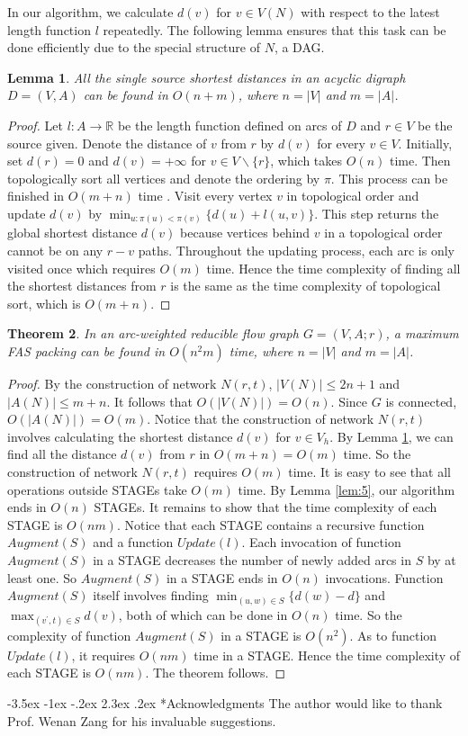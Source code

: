 \documentclass[11pt]{article}
\makeatletter
\newtheorem{theorem}{Theorem}[section]
\newtheorem{lemma}[theorem]{Lemma}
\renewcommand\section{%
  \@startsection{section}{1}
                {\z@}%
                {-3.5ex \@plus -1ex \@minus -.2ex}%
                {2.3ex \@plus.2ex}%
                {\large\bfseries}%
}
\makeatother
\begin{document}
In our algorithm, we calculate $d(v)$ for $v\in V(N)$ with respect to the latest length function $l$ repeatedly. The following lemma ensures that this task can be done efficiently due to the special structure of $N$, a DAG.

\begin{lemma}
\label{lem:6}
All the single source shortest distances in an acyclic digraph $D=(V,A)$ can be found in $O(n+m)$, where $n=\lvert V \rvert$ and $m=\lvert A \rvert$.
\end{lemma}
\begin{proof}
Let $l:A\rightarrow \mathbb{R}$ be the length function defined on arcs of $D$ and $r\in V$ be the source given. Denote the distance of $v$ from $r$ by $d(v)$ for every $v\in V$. Initially, set $d(r)=0$ and $d(v)=+\infty$ for $v\in V\backslash \{r\}$, which takes $O(n)$ time. Then topologically sort all vertices and denote the ordering by $\pi$. This process can be finished in $O(m+n)$ time \cite{AhMO}. Visit every vertex $v$ in topological order and update $d(v)$ by $\min_{u:\pi(u)<\pi(v)}\{d(u)+l(u,v)\}$. This step returns the global shortest distance $d(v)$ because vertices behind $v$ in a topological order cannot be on any $r-v$ paths. Throughout the updating process, each arc is only visited once which requires $O(m)$ time. Hence the time complexity of finding all the shortest distances from $r$ is the same as the time complexity of topological sort, which is $O(m+n)$.
\end{proof}

\begin{theorem}
\label{thm:5}
In an arc-weighted reducible flow graph $G=(V,A;r)$, a maximum FAS packing can be found in $O(n^2 m)$ time, where $n=\lvert V \rvert$ and $m=\lvert A \rvert$.
\end{theorem}
\begin{proof}
By the construction of network $N(r,t)$, $\lvert V(N)\rvert\leq 2n+1$ and $\lvert A(N)\rvert\leq m+n$. It follows that $O(\lvert V(N)\rvert)=O(n)$. Since $G$ is connected, $O(\lvert A(N)\rvert)=O(m)$. Notice that the construction of network $N(r,t)$ involves calculating the shortest distance $d(v)$ for $v\in V_h$. By Lemma \ref{lem:6}, we can find all the distance $d(v)$ from $r$ in $O(m+n)=O(m)$ time. So the construction of network $N(r,t)$ requires $O(m)$ time. It is easy to see that all operations outside STAGEs take $O(m)$ time. By Lemma \ref{lem:5}, our algorithm ends in $O(n)$ STAGEs. It remains to show that the time complexity of each STAGE is $O(nm)$. Notice that each STAGE contains a recursive function $Augment(S)$ and a function $Update(l)$. Each invocation of function $Augment(S)$ in a STAGE decreases the number of newly added arcs in $S$ by at least one. So $Augment(S)$ in a STAGE ends in $O(n)$ invocations. Function $Augment(S)$ itself involves finding $\min_{(u,w)\in S}\{d(w)-d\}$ and $\max_{(v^\prime,t)\in S} d(v)$, both of which can be done in $O(n)$ time. So the complexity of function $Augment(S)$ in a STAGE is $O(n^2)$. As to function $Update(l)$, it requires $O(nm)$ time in a STAGE. Hence the time complexity of each STAGE is $O(nm)$. The theorem follows.
\end{proof}

\section*{Acknowledgments}
The author would like to thank Prof. Wenan Zang for his invaluable suggestions.



\nocite{HecU2,Sham}
\end{document}
